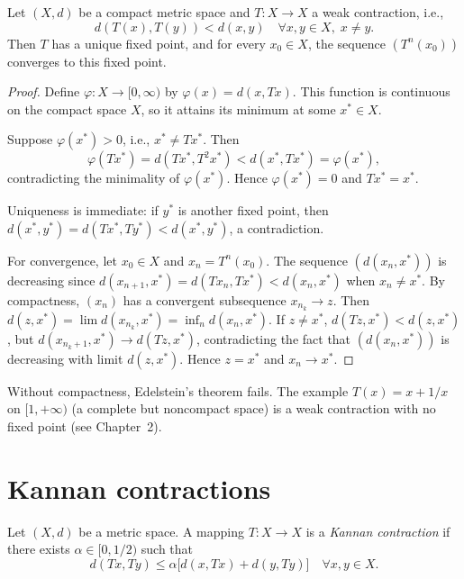 \begin{theorem}[Edelstein, 1962]\label{thm:edelstein}
Let $(X, d)$ be a compact metric space and $T : X \to X$ a weak contraction,
i.e.,
\[
    d(T(x), T(y)) < d(x, y) \quad \forall x, y \in X, \; x \neq y.
\]
Then $T$ has a unique fixed point, and for every $x_0 \in X$, the sequence
$(T^n(x_0))$ converges to this fixed point.
\end{theorem}

\begin{proof}
Define $\varphi : X \to [0, \infty)$ by $\varphi(x) = d(x, Tx)$. This function
is continuous on the compact space $X$, so it attains its minimum at some
$x^* \in X$.

Suppose $\varphi(x^*) > 0$, i.e., $x^* \neq Tx^*$. Then
\[
    \varphi(Tx^*) = d(Tx^*, T^2 x^*) < d(x^*, Tx^*) = \varphi(x^*),
\]
contradicting the minimality of $\varphi(x^*)$. Hence $\varphi(x^*) = 0$ and
$Tx^* = x^*$.

Uniqueness is immediate: if $y^*$ is another fixed point, then
$d(x^*, y^*) = d(Tx^*, Ty^*) < d(x^*, y^*)$, a contradiction.

For convergence, let $x_0 \in X$ and $x_n = T^n(x_0)$. The sequence
$(d(x_n, x^*))$ is decreasing since
$d(x_{n+1}, x^*) = d(Tx_n, Tx^*) < d(x_n, x^*)$ when $x_n \neq x^*$.
By compactness, $(x_n)$ has a convergent subsequence $x_{n_k} \to z$.
Then $d(z, x^*) = \lim d(x_{n_k}, x^*) = \inf_n d(x_n, x^*)$. If $z \neq x^*$,
$d(Tz, x^*) < d(z, x^*)$, but $d(x_{n_k + 1}, x^*) \to d(Tz, x^*)$,
contradicting the fact that $(d(x_n, x^*))$ is decreasing with limit
$d(z, x^*)$. Hence $z = x^*$ and $x_n \to x^*$.
\end{proof}

\begin{warning}[title=\textbf{Compactness is essential}]
Without compactness, Edelstein's theorem fails. The example $T(x) = x + 1/x$ on
$[1, +\infty)$ (a complete but noncompact space) is a weak contraction with no
fixed point (see Chapter~2).
\end{warning}

\section{Kannan contractions}

\begin{definition}
Let $(X, d)$ be a metric space. A mapping $T : X \to X$ is a \emph{Kannan
contraction} if there exists $\alpha \in [0, 1/2)$ such that
\[
    d(Tx, Ty) \leq \alpha \bigl[ d(x, Tx) + d(y, Ty) \bigr] \quad \forall x, y \in X.
\]
\end{definition}

